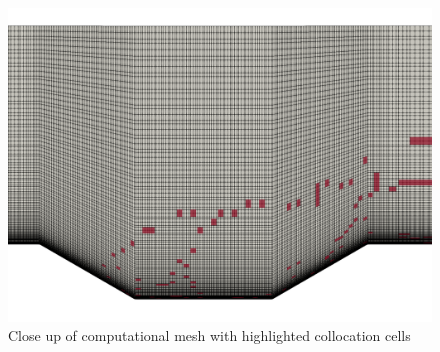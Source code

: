 \begin{figure} 
\begin{center}
\includegraphics[trim={0cm 0cm 0cm 0cm},clip,width=0.65\linewidth]{figs/cavity/hyper_grid.png}
\caption{Close up of computational mesh with highlighted collocation cells} 
\label{fig:cav_sampmesh}
\end{center}
\end{figure}


